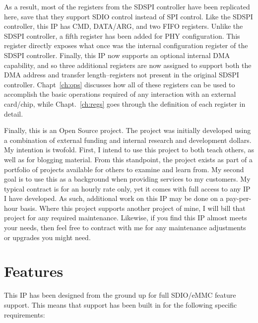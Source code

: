 \documentclass{gqtekspec}
\begin{document}
As a result, most of the registers from the SDSPI controller have been
replicated here, save that they support SDIO control instead of SPI control.
Like the SDSPI controller, this IP has CMD, DATA/ARG, and two FIFO registers.
Unlike the SDSPI controller, a fifth register has been added for PHY
configuration.  This register directly exposes what once was the internal
configuration register of the SDSPI controller.  Finally, this IP now supports
an optional internal DMA capability, and so three additional registers are now
assigned to support both the DMA address and transfer length--registers not
present in the original SDSPI controller.  Chapt~\ref{ch:ops} discusses how
all of these registers can be used to accomplish the basic operations required
of any interaction with an external card/chip, while Chapt.~\ref{ch:regs} goes
through the definition of each register in detail.

Finally, this is an Open Source project.  The project was initially
developed using a combination of external funding and internal research and
development dollars.  My intention is twofold.  First, I intend to use this
project to both teach others, as well as for blogging material.  From this
standpoint, the project exists as part of a portfolio of projects available for
others to examine and learn from.  My second goal is to use this as a
background when providing services to my customers.  My typical contract is
for an hourly rate only, yet it comes with full access to any IP I have
developed.  As such, additional work on this IP may be done on a pay-per-hour
basis.  Where this project supports another project of mine, I will bill that
project for any required maintenance.  Likewise, if you find this IP almost
meets your needs, then feel free to contract with me for any maintenance
adjustments or upgrades you might need.
\chapter{Features}\label{ch:features}
This IP has been designed from the ground up for full SDIO/eMMC feature
support.  This means that support has been built in for the following
specific requirements:
\end{document}
